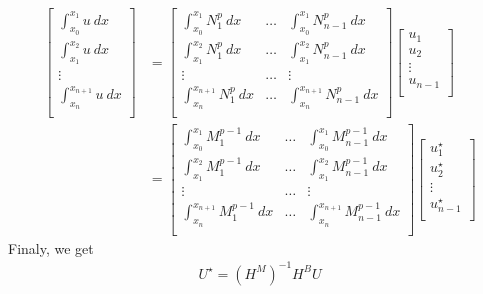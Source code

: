 \begin{align*}
  \begin{bmatrix}
    \int_{x_0}^{x_{1}}u ~dx\\
    \int_{x_1}^{x_{2}}u ~dx\\
    \vdots    \\ 
    \int_{x_n}^{x_{n+1}}u ~dx\\
  \end{bmatrix}
  &=
  \begin{bmatrix}
    \int_{x_0}^{x_{1}}N_1^p ~dx   & \ldots & \int_{x_0}^{x_{1}}N_{n-1}^p ~dx   \\
    \int_{x_1}^{x_{2}}N_1^p ~dx   & \ldots & \int_{x_1}^{x_{2}}N_{n-1}^p ~dx   \\
    \vdots                        & \ldots &                        \vdots \\
    \int_{x_n}^{x_{n+1}}N_1^p ~dx & \ldots & \int_{x_n}^{x_{n+1}}N_{n-1}^p ~dx \\
  \end{bmatrix}
  \begin{bmatrix}
    u_1\\
    u_2\\
    \vdots\\ 
    u_{n-1}\\
  \end{bmatrix}
  \\
  &= 
  \begin{bmatrix}
    \int_{x_0}^{x_{1}}M_1^{p-1} ~dx   & \ldots & \int_{x_0}^{x_{1}}M_{n-1}^{p-1} ~dx   \\
    \int_{x_1}^{x_{2}}M_1^{p-1} ~dx   & \ldots & \int_{x_1}^{x_{2}}M_{n-1}^{p-1} ~dx   \\
    \vdots                        & \ldots &                        \vdots \\
    \int_{x_n}^{x_{n+1}}M_1^{p-1} ~dx & \ldots & \int_{x_n}^{x_{n+1}}M_{n-1}^{p-1} ~dx \\
  \end{bmatrix}
  \begin{bmatrix}
    u_1^\star\\
    u_2^\star\\
    \vdots\\ 
    u_{n-1}^\star\\
  \end{bmatrix}
\end{align*}
Finaly, we get
\begin{align}
  U^\star = \left( H^{M} \right)^{-1} H^{B} U  
\end{align}
